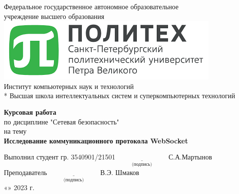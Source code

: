 \begin{titlepage}

\begin{center} %
Федеральное государственное автономное образовательное \\
учреждение высшего образования \\[0.4cm]
\includegraphics[scale=0.8]{res/SPbPU-logo} \\[0.4cm]
Институт компьютерных наук и технологий \\*
Высшая школа интеллектуальных систем и суперкомпьютерных технологий
\end{center}

\vspace{3cm}

\begin{center} %
\textbf{Курсовая работа}\\
по дисциплине "Сетевая безопасность"\\
на тему\\
\textbf{Исследование коммуникационного протокола WebSocket}
\end{center}

\vspace{3.5cm}
 
\begin{flushleft}
Выполнил студент гр. 3540901/21501 \hspace{3cm} $\underset{\text{(подпись)}}{\underline{\hspace{3cm}}}$ С.А.Мартынов\\[0.5cm]
Преподаватель \hspace{7.25cm} $\underset{\text{(подпись)}}{\underline{\hspace{3cm}}}$ В.Э. Шмаков\\[0.5cm]
\hspace{10.2cm} «\underline{\hspace{1cm}}» \underline{\hspace{3cm}} 2023 г.
\end{flushleft}


\end{titlepage}
